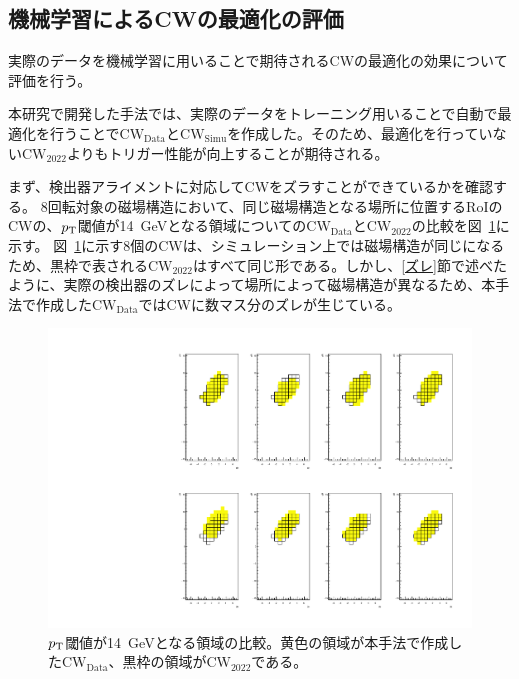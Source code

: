 \subsection{機械学習によるCWの最適化の評価}
実際のデータを機械学習に用いることで期待されるCWの最適化の効果について評価を行う。

本研究で開発した手法では、実際のデータをトレーニング用いることで自動で最適化を行うことで$\mathrm{CW_{Data}}$と$\mathrm{CW_{Simu}}$を作成した。そのため、最適化を行っていない$\mathrm{CW_{2022}}$よりもトリガー性能が向上することが期待される。

まず、検出器アライメントに対応してCWをズラすことができているかを確認する。
8回転対象の磁場構造において、同じ磁場構造となる場所に位置するRoIのCWの、$p_{\rm{T}}$閾値が14~GeVとなる領域についての$\mathrm{CW_{Data}}$と$\mathrm{CW_{2022}}$の比較を図~\ref{fig:CWv05v07}に示す。
図~\ref{fig:CWv05v07}に示す8個のCWは、シミュレーション上では磁場構造が同じになるため、黒枠で表される$\mathrm{CW_{2022}}$はすべて同じ形である。しかし、\ref{ズレ}節で述べたように、実際の検出器のズレによって場所によって磁場構造が異なるため、本手法で作成した$\mathrm{CW_{Data}}$ではCWに数マス分のズレが生じている。
\begin{figure}[tb]
  \centering
  \includegraphics[clip, width=13cm]{fig/5/ALL_Aside_Endcap_phiSector_Octant1_roi58.pdf}
  \caption{$p_{\rm{T}}$閾値が14~GeVとなる領域の比較。黄色の領域が本手法で作成した$\mathrm{CW_{Data}}$、黒枠の領域が$\mathrm{CW_{2022}}$である。}
  \label{fig:CWv05v07}
\end{figure}

